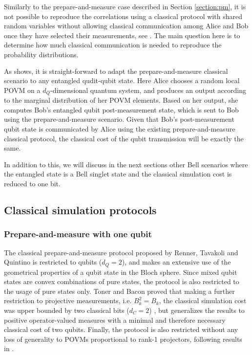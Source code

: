 Similarly to the prepare-and-measure case described in Section \ref{section:pm}, it is not possible to reproduce the correlations using a classical protocol with shared random variables without allowing classical communication among Alice and Bob once they have selected their measurements, see \cite{bell1964}. The main question here is to determine how much classical communication is needed to reproduce the probability distributions.

As \cite{renner2022} shows, it is straight-forward to adapt the prepare-and-measure classical scenario to any entangled qudit-qubit state. Here Alice chooses a random local POVM on a $d_Q$-dimensional quantum system, and produces an output according to the marginal distribution of her POVM elements. Based on her output, she computes Bob's entangled qubit post-measurement state, which is sent to Bob using the prepare-and-measure scenario. Given that Bob's post-measurement qubit state is communicated by Alice using the existing prepare-and-measure classical protocol, the classical cost of the qubit transmission will be exactly the same. 

In addition to this, we will discuss in the next sections other Bell scenarios where the entangled state is a Bell singlet state and the classical simulation cost is reduced to one bit.


\subsection{Classical simulation protocols}\label{section:protocols}
\subsubsection{Prepare-and-measure with one qubit}\label{section:protocol_pm}
The classical prepare-and-measure protocol proposed by Renner, Tavakoli and Quintino \cite{renner2022} is restricted to qubits ($d_Q=2$), and makes an extensive use of the geometrical properties of a qubit state in the Bloch sphere. Since mixed qubit states are convex combinations of pure states, the protocol is also restricted to the usage of pure states only. Toner and Bacon proved that making a further restriction to projective measurements, i.e. $B_{k}^{2} = B_{k}$, the classical simulation cost was upper bounded by two classical bits ($d_C=2$) \cite{toner2003}, but \cite{renner2022} generalizes the results to positive operator-valued measures with a minimal and therefore necessary classical cost of two qubits. Finally, the protocol is also restricted without any loss of generality to POVMs proportional to rank-1 projectors, following results in \cite{barrett2002}.

